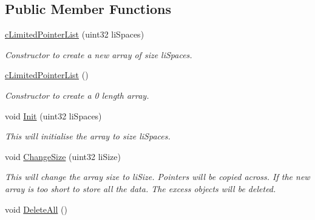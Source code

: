 \subsection*{Public Member Functions}
\begin{DoxyCompactItemize}
\item 
\hypertarget{classc_limited_pointer_list_a07bb790fa0cce46a4724f87445278a2a}{
\hyperlink{classc_limited_pointer_list_a07bb790fa0cce46a4724f87445278a2a}{cLimitedPointerList} (uint32 liSpaces)}
\label{classc_limited_pointer_list_a07bb790fa0cce46a4724f87445278a2a}

\begin{DoxyCompactList}\small\item\em Constructor to create a new array of size liSpaces. \end{DoxyCompactList}\item 
\hypertarget{classc_limited_pointer_list_ad423e1b82ff902578d76e1e8ba33407f}{
\hyperlink{classc_limited_pointer_list_ad423e1b82ff902578d76e1e8ba33407f}{cLimitedPointerList} ()}
\label{classc_limited_pointer_list_ad423e1b82ff902578d76e1e8ba33407f}

\begin{DoxyCompactList}\small\item\em Constructor to create a 0 length array. \end{DoxyCompactList}\item 
\hypertarget{classc_limited_pointer_list_ab72b03a5d82ee318bf21d3102bdfecda}{
void \hyperlink{classc_limited_pointer_list_ab72b03a5d82ee318bf21d3102bdfecda}{Init} (uint32 liSpaces)}
\label{classc_limited_pointer_list_ab72b03a5d82ee318bf21d3102bdfecda}

\begin{DoxyCompactList}\small\item\em This will initialise the array to size liSpaces. \end{DoxyCompactList}\item 
\hypertarget{classc_limited_pointer_list_a7d77c2291a85cb39f06776e8d8555030}{
void \hyperlink{classc_limited_pointer_list_a7d77c2291a85cb39f06776e8d8555030}{ChangeSize} (uint32 liSize)}
\label{classc_limited_pointer_list_a7d77c2291a85cb39f06776e8d8555030}

\begin{DoxyCompactList}\small\item\em This will change the array size to liSize. Pointers will be copied across. If the new array is too short to store all the data. The excess objects will be deleted. \end{DoxyCompactList}\item 
\hypertarget{classc_limited_pointer_list_a5cd2eaf04fa51a23e35bb78ba875501f}{
void \hyperlink{classc_limited_pointer_list_a5cd2eaf04fa51a23e35bb78ba875501f}{DeleteAll} ()}
\label{classc_limited_pointer_list_a5cd2eaf04fa51a23e35bb78ba875501f}


\end{DoxyCompactItemize}
